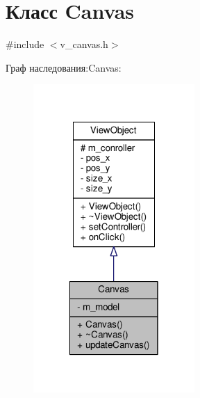 \hypertarget{class_canvas}{\section{Класс Canvas}
\label{class_canvas}
}


{\ttfamily \#include $<$v\-\_\-canvas.\-h$>$}



Граф наследования\-:Canvas\-:
\nopagebreak
\begin{figure}[H]
\begin{center}
\leavevmode
\includegraphics[width=174pt]{class_canvas__inherit__graph}
\end{center}
\end{figure}


